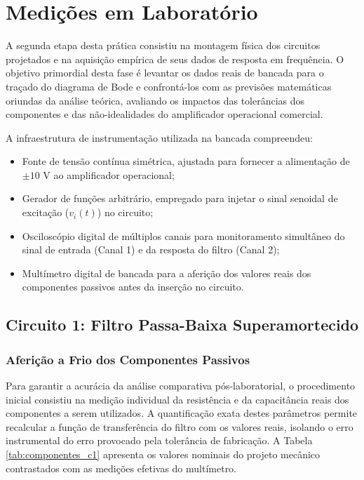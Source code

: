 \chapter{Medições em Laboratório}

A segunda etapa desta prática consistiu na montagem física dos circuitos projetados e na aquisição empírica de seus dados de resposta em frequência. O objetivo primordial desta fase é levantar os dados reais de bancada para o traçado do diagrama de Bode e confrontá-los com as previsões matemáticas oriundas da análise teórica, avaliando os impactos das tolerâncias dos componentes e das não-idealidades do amplificador operacional comercial.

A infraestrutura de instrumentação utilizada na bancada compreendeu:
\begin{itemize}
	\item Fonte de tensão contínua simétrica, ajustada para fornecer a alimentação de $\pm 10\text{ V}$ ao amplificador operacional;
	\item Gerador de funções arbitrário, empregado para injetar o sinal senoidal de excitação ($v_i(t)$) no circuito;
	\item Osciloscópio digital de múltiplos canais para monitoramento simultâneo do sinal de entrada (Canal 1) e da resposta do filtro (Canal 2);
	\item Multímetro digital de bancada para a aferição dos valores reais dos componentes passivos antes da inserção no circuito.
\end{itemize}

\section{Circuito 1: Filtro Passa-Baixa Superamortecido}

\subsection{Aferição a Frio dos Componentes Passivos}

Para garantir a acurácia da análise comparativa pós-laboratorial, o procedimento inicial consistiu na medição individual da resistência e da capacitância reais dos componentes a serem utilizados. A quantificação exata destes parâmetros permite recalcular a função de transferência do filtro com os valores reais, isolando o erro instrumental do erro provocado pela tolerância de fabricação. A Tabela \ref{tab:componentes_c1} apresenta os valores nominais do projeto mecânico contrastados com as medições efetivas do multímetro.


